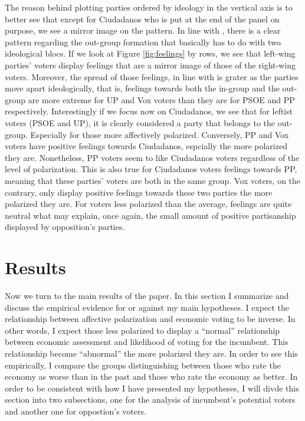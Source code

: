 \documentclass[a4paper, svgnames]{article}
\begin{document}
The reason behind plotting parties ordered by ideology in the vertical axis is to better see that except for Ciudadanos who is put at the end of the panel on purpose, we see a mirror image on the pattern. In line with \citep*{Orriols2020}, there is a clear pattern regarding the out-group formation that basically has to do with two ideological blocs. If we look at Figure \ref{fig:feelings} by rows, we see that left-wing parties' voters display feelings that are a mirror image of those of the right-wing voters. Moreover, the spread of those feelings, in line with \citep*{Wagner2021} is grater as the parties move apart ideologically, that is, feelings towards both the in-group and the  out-group are more extreme for UP and Vox voters than they are for PSOE and PP respectively. Interestingly if we focus now on Ciudadanos, we see that for leftist voters (PSOE and UP), it is clearly considered a party that belongs to the out-group. Especially for those more affectively polarized. Conversely, PP and Vox voters have positive feelings towards Ciudadanos, espcially the more polarized they are. Nonetheless, PP voters seem to like Ciudadanos voters regardless of the level of polarization. This is also true for Ciudadanos voters feelings towards PP, meaning that these parties' voters are both in the same group. Vox voters, on the contrary, only display positive feelings towards these two parties the more polarized they are. For voters less polarized than the average, feelings are quite neutral what may explain, once again, the small amount of positive partisanship displayed by opposition's parties.

\newpage

\section{Results}

Now we turn to the main results of the paper. In this section I summarize and discuss the empirical evidence for or against my main hypotheses. I expect the relationship between affective polarization and economic voting to be inverse. In other words, I expect those less polarized to display a ``normal'' relationship between economic assessment and likelihood of voting for the incumbent. This relationship become ``abnormal'' the more polarized they are. In order to see this empirically, I compare the groups distinguishing between those who rate the economy as worse than in the past and those who rate the economy as better. In order to be consistent with how I have presented my hypotheses, I will divde this section into two subsections, one for the analysis of incumbent's potential voters and another one for oppostion's voters.
\end{document}
